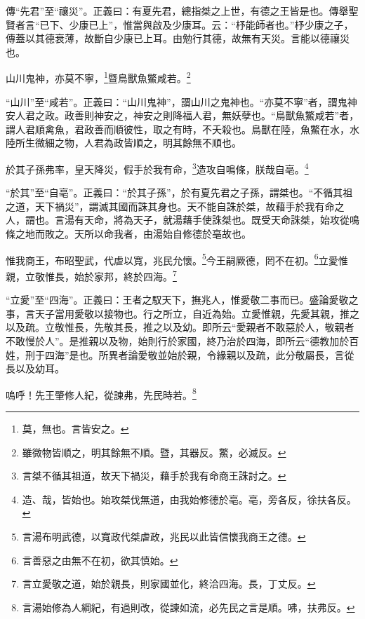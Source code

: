 {\noindent\zhuan{}\fzbyks 傳“先君”至“禳災”。正義曰：有夏先君，總指桀之上世，有德之王皆是也。傳舉聖賢者言“已下、少康已上”，惟當與啟及少康耳。云：“杼能師者也。”杼少康之子，傳蓋以其德衰薄，故斷自少康已上耳。由勉行其德，故無有天災。言能以德禳災也。 \par}

山川鬼神，亦莫不寧，\footnote{莫，無也。言皆安之。}暨鳥獸魚鱉咸若。\footnote{雖微物皆順之，明其餘無不順。暨，其器反。鱉，必滅反。}

{\noindent\shu{}\fzkt “山川”至“咸若”。正義曰：“山川鬼神”，謂山川之鬼神也。“亦莫不寧”者，謂鬼神安人君之政。政善則神安之，神安之則降福人君，無妖孽也。“鳥獸魚鱉咸若”者，謂人君順禽魚，君政善而順彼性，取之有時，不夭殺也。鳥獸在陸，魚鱉在水，水陸所生微細之物，人君為政皆順之，明其餘無不順也。 \par}

於其子孫弗率，皇天降災，假手於我有命，\footnote{言桀不循其祖道，故天下禍災，藉手於我有命商王誅討之。}造攻自鳴條，朕哉自亳。\footnote{造、哉，皆始也。始攻桀伐無道，由我始修德於亳。亳，旁各反，徐扶各反。}

{\noindent\shu{}\fzkt “於其”至“自亳”。正義曰：“於其子孫”，於有夏先君之子孫，謂桀也。“不循其祖之道，天下禍災”，謂滅其國而誅其身也。天不能自誅於桀，故藉手於我有命之人，謂也。言湯有天命，將為天子，就湯藉手使誅桀也。既受天命誅桀，始攻從鳴條之地而敗之。天所以命我者，由湯始自修德於亳故也。 \par}

惟我商王，布昭聖武，代虐以寬，兆民允懷。\footnote{言湯布明武德，以寬政代桀虐政，兆民以此皆信懷我商王之德。}今王嗣厥德，罔不在初。\footnote{言善惡之由無不在初，欲其慎始。}立愛惟親，立敬惟長，始於家邦，終於四海。\footnote{言立愛敬之道，始於親長，則家國並化，終洽四海。長，丁丈反。}

{\noindent\shu{}\fzkt “立愛”至“四海”。正義曰：王者之馭天下，撫兆人，惟愛敬二事而已。盛論愛敬之事，言天子當用愛敬以接物也。行之所立，自近為始。立愛惟親，先愛其親，推之以及疏。立敬惟長，先敬其長，推之以及幼。即所云“愛親者不敢惡於人，敬親者不敢慢於人”。是推親以及物，始則行於家國，終乃治於四海，即所云“德教加於百姓，刑于四海”是也。所異者論愛敬並始於親，令緣親以及疏，此分敬屬長，言從長以及幼耳。 \par}

嗚呼！先王肇修人紀，從諫弗，先民時若。\footnote{言湯始修為人綱紀，有過則改，從諫如流，必先民之言是順。咈，扶弗反。}

